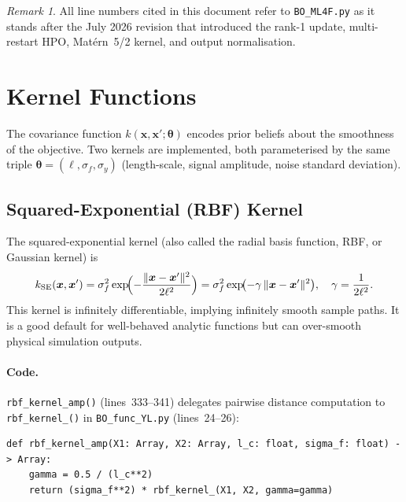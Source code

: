 \documentclass[11pt,a4paper]{article}
\newcommand{\bx}{\bm{x}}
\newcommand{\btheta}{\bm{\theta}}
\theoremstyle{remark}
\newtheorem{remark}{Remark}
\newcommand{\codefile}[1]{\texttt{#1}}
\newcommand{\coderange}[2]{lines~#1--#2}
\newcommand{\codefn}[1]{\texttt{#1()}}
\begin{document}
\begin{remark}
All line numbers cited in this document refer to \codefile{BO\_ML4F.py} as it
stands after the July 2026 revision that introduced the rank-1 update,
multi-restart HPO, Mat\'{e}rn~5/2 kernel, and output normalisation.
\end{remark}

\section{Kernel Functions}
\label{sec:kernels}

The covariance function $k(\bx,\bx';\btheta)$ encodes prior beliefs about the
smoothness of the objective.  Two kernels are implemented, both parameterised
by the same triple $\btheta = (\ell, \sigma_f, \sigma_y)$ (length-scale,
signal amplitude, noise standard deviation).

\subsection{Squared-Exponential (RBF) Kernel}
\label{sec:rbf}

The squared-exponential kernel (also called the radial basis function, RBF,
or Gaussian kernel) is
\begin{equation}
  \label{eq:rbf}
  k_{\mathrm{SE}}(\bx,\bx') = \sigma_f^2
      \exp\!\Bigl(-\frac{\|\bx-\bx'\|^2}{2\ell^2}\Bigr)
    = \sigma_f^2 \exp\!\bigl(-\gamma\,\|\bx-\bx'\|^2\bigr),
  \quad \gamma = \frac{1}{2\ell^2}.
\end{equation}
This kernel is infinitely differentiable, implying infinitely smooth sample
paths.  It is a good default for well-behaved analytic functions but can
over-smooth physical simulation outputs.

\paragraph{Code.}
\codefn{rbf\_kernel\_amp} (\coderange{333}{341}) delegates pairwise
distance computation to \codefn{rbf\_kernel\_} in \codefile{BO\_func\_YL.py}
(\coderange{24}{26}):

\begin{lstlisting}[firstnumber=333, caption=\codefn{rbf\_kernel\_amp} in \codefile{BO\_ML4F.py}]
def rbf_kernel_amp(X1: Array, X2: Array, l_c: float, sigma_f: float) -> Array:
    gamma = 0.5 / (l_c**2)
    return (sigma_f**2) * rbf_kernel_(X1, X2, gamma=gamma)
\end{lstlisting}
\end{document}
